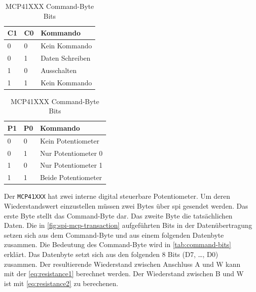 \begin{table}
    \centering
    \begin{subtable}[t]{5cm}
        \centering
        \begin{tabular}{|l|l|l|}
            \hline
            \textbf{C1} & \textbf{C0} & \textbf{Kommando} \\
            \hline
            \hline
            0 & 0 & Kein Kommando \\
            \hline
            0 & 1 & Daten Schreiben \\
            \hline
            1 & 0 & Ausschalten \\
            \hline
            1 & 1 & Kein Kommando \\
            \hline
        \end{tabular}
        \caption{Kommando Bits}\label{command:1a}
    \end{subtable}
    \quad
    \begin{subtable}[t]{5cm}
        \centering
        \begin{tabular}{|l|l|l|}
            \hline
            \textbf{P1} & \textbf{P0} & \textbf{Kommando} \\
            \hline
            \hline
            0 & 0 & Kein Potentiometer \\
            \hline
            0 & 1 & Nur Potentiometer 0 \\
            \hline
            1 & 0 & Nur Potentiometer 1 \\
            \hline
            1 & 1 & Beide Potentiometer \\
            \hline
        \end{tabular}
        \caption{Potentiometer bits}\label{command:1b}
    \end{subtable}
    \caption{MCP41XXX Command-Byte Bits}
    \label{tab:command-bits}
\end{table}

Der \texttt{MCP41XXX} hat zwei interne digital steuerbare Potentiometer.
Um deren Wiederstandswert einzustellen müssen zwei Bytes über \gls{spi} gesendet werden.
Das erste Byte stellt das Command-Byte dar.
Das zweite Byte die tatsächlichen Daten.
Die in \autoref{fig:spi-mcp-transaction} aufgeführten Bits in der Datenübertragung setzen sich aus dem Command-Byte und aus einem folgenden Datenbyte zusammen.
Die Bedeutung des Command-Byte wird in \autoref{tab:command-bits} erklärt.
Das Datenbyte setzt sich aus den folgenden 8 Bits (D7, \ldots, D0) zusammen.
Der resultierende Wiederstand zwischen Anschluss A und W kann mit der \autoref{eq:resistance1} berechnet werden.
Der Wiederstand zwischen B und W ist mit \autoref{eq:resistance2} zu berechenen.

